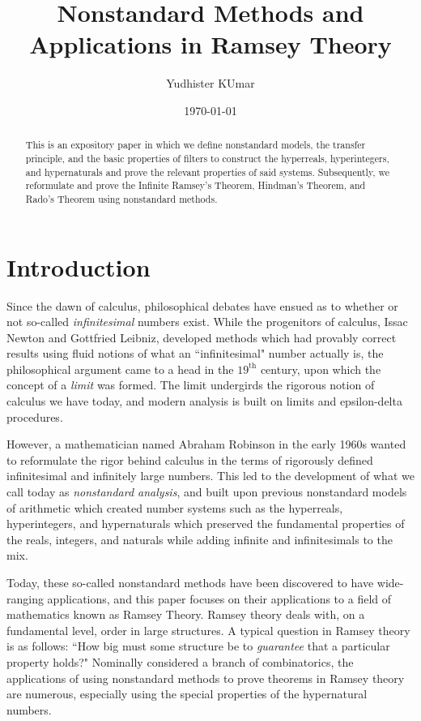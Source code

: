 \documentclass[12pt]{amsart}
\theoremstyle{plain}
\theoremstyle{definition}
\theoremstyle{remark}
\theoremstyle{theorem}
\numberwithin{equation}{section}
\numberwithin{thm}{section}
\begin{document}
\title{Nonstandard Methods and Applications in Ramsey Theory}
\author{Yudhister KUmar}
\date{\today}
\maketitle


\begin{abstract}
    This is an expository paper in which we define nonstandard models, the transfer principle, and the basic properties of filters to construct the hyperreals, hyperintegers, and hypernaturals and prove the relevant properties of said systems. Subsequently, we reformulate and prove the Infinite Ramsey's Theorem, Hindman's Theorem, and Rado's Theorem using nonstandard methods. 
\end{abstract}

\section{Introduction}
Since the dawn of calculus, philosophical debates have ensued as to whether or not so-called \textit{infinitesimal} numbers exist. While the progenitors of calculus, Issac Newton and Gottfried Leibniz, developed methods which had provably correct results using fluid notions of what an ``infinitesimal" number actually is, the philosophical argument came to a head in the $19^{\text{th}}$ century, upon which the concept of a \textit{limit} was formed. The limit undergirds the rigorous notion of calculus we have today, and modern analysis is built on limits and epsilon-delta procedures.

However, a mathematician named Abraham Robinson in the early 1960s wanted to reformulate the rigor behind calculus in the terms of rigorously defined infinitesimal and infinitely large numbers. This led to the development of what we call today as \textit{nonstandard analysis}, and built upon previous nonstandard models of arithmetic which created number systems such as the hyperreals, hyperintegers, and hypernaturals which preserved the fundamental properties of the reals, integers, and naturals while adding infinite and infinitesimals to the mix. 

Today, these so-called nonstandard methods have been discovered to have wide-ranging applications, and this paper focuses on their applications to a field of mathematics known as Ramsey Theory. Ramsey theory deals with, on a fundamental level, order in large structures. A typical question in Ramsey theory is as follows: ``How big must some structure be to \textit{guarantee} that a particular property holds?" Nominally considered a branch of combinatorics, the applications of using nonstandard methods to prove theorems in Ramsey theory are numerous, especially using the special properties of the hypernatural numbers.
\end{document}

